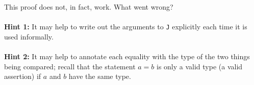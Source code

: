 \documentclass{article}
\begin{document}
\begin{enumerate}
    This proof does not, in fact, work.  What went wrong? \\ \\
    \textbf{Hint 1:} It may help to write out the arguments to \texttt{J} explicitly each time it is used informally. \\ \\
    \textbf{Hint 2:} It may help to annotate each equality with the type of the two things being compared; recall that the statement $a = b$ is only a valid type (a valid assertion) if $a$ and $b$ have the same type.
\end{enumerate}
\cfoot{}

\end{document}
